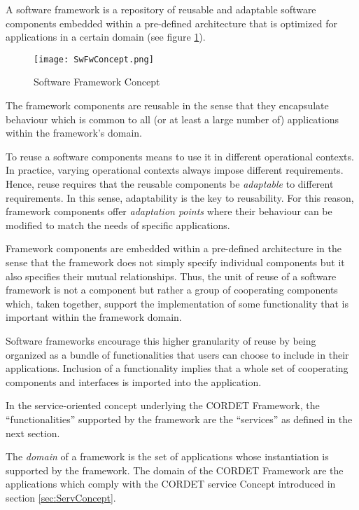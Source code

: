 A software framework is a repository of reusable and adaptable software components embedded within a pre-defined architecture that is optimized for applications in a certain domain (see figure \ref{fig:SwFwConcept}).

\begin{figure}[ht]
 \centering
 \texttt{[image: SwFwConcept.png]}
 \caption{Software Framework Concept}
 \label{fig:SwFwConcept}
\end{figure}

The framework components are reusable in the sense that they encapsulate behaviour which is common to all (or at least a large number of) applications within the framework's domain.

To reuse a software components means to use it in different operational contexts. 
In practice, varying operational contexts always impose different requirements. 
Hence, reuse requires that the reusable components be \textit{adaptable} to different requirements. 
In this sense, adaptability is the key to reusability. 
For this reason, framework components offer \textit{adaptation points} where their behaviour can be modified to match the needs of specific applications.

Framework components are embedded within a pre-defined architecture in the sense that the framework does not simply specify individual components but it also specifies their mutual relationships. 
Thus, the unit of reuse of a software framework is not a component but rather a group of cooperating components which, taken together, support the implementation of some functionality that is important within the framework domain. 

Software frameworks encourage this higher granularity of reuse by being organized as a bundle of functionalities that users can choose to include in their applications. 
Inclusion of a functionality implies that a whole set of cooperating components and interfaces is imported into the application. 

In the service-oriented concept underlying the CORDET Framework, the “functionalities” supported by the framework are the “services” as defined in the next section.

The \textit{domain} of a framework is the set of applications whose instantiation is supported by the framework. The domain of the CORDET Framework are the applications which comply with the CORDET service Concept introduced in section \ref{sec:ServConcept}.

